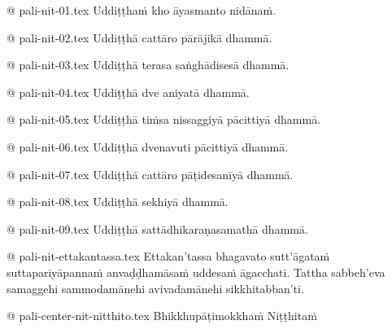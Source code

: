 @ pali-nit-01.tex
Uddiṭṭhaṁ kho āyasmanto nidānaṁ.

@ pali-nit-02.tex
Uddiṭṭhā cattāro pārājikā dhammā.

@ pali-nit-03.tex
Uddiṭṭhā terasa saṅghādisesā dhammā.

@ pali-nit-04.tex
Uddiṭṭhā dve aniyatā dhammā.

@ pali-nit-05.tex
Uddiṭṭhā tiṁsa nissaggiyā pācittiyā dhammā.

@ pali-nit-06.tex
Uddiṭṭhā dvenavuti pācittiyā dhammā.

@ pali-nit-07.tex
Uddiṭṭhā cattāro pāṭidesanīyā dhammā.

@ pali-nit-08.tex
Uddiṭṭhā sekhiyā dhammā.

@ pali-nit-09.tex
Uddiṭṭhā sattādhikaraṇasamathā dhammā.

@ pali-nit-ettakantassa.tex
Ettakan’tassa bhagavato sutt’āgataṁ suttapariyāpannaṁ anvaḍḍhamāsaṁ uddesaṁ āgacchati. Tattha sabbeh’eva samaggehi sammodamānehi avivadamānehi sikkhitabban’ti.

@ pali-center-nit-nitthito.tex
Bhikkhupāṭimokkhaṁ Niṭṭhitaṁ
